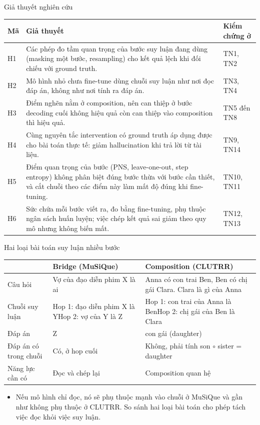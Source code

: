 \documentclass[aspectratio=169,t,10pt]{beamer}
\begin{document}
\begin{frame}[shrink]{Giả thuyết nghiên cứu}
\small
\renewcommand{\arraystretch}{1.35}
\begin{tabularx}{\textwidth}{@{}P{0.8cm}YP{2.4cm}@{}}
\toprule
\textbf{Mã} & \textbf{Giả thuyết} & \textbf{Kiểm chứng ở}\\
\midrule
H1 & Các phép đo tầm quan trọng của bước suy luận đang dùng (masking một bước, resampling) cho kết quả lệch khi đối chiếu với ground truth. & TN1, TN2\\
H2 & Mô hình nhỏ chưa fine-tune dùng chuỗi suy luận như nơi đọc đáp án, không như nơi tính ra đáp án. & TN3, TN4\\
H3 & Điểm nghẽn nằm ở composition, nên can thiệp ở bước decoding cuối không hiệu quả còn can thiệp vào composition thì hiệu quả. & TN5 đến TN8\\
H4 & Cùng nguyên tắc intervention có ground truth áp dụng được cho bài toán thực tế: giảm hallucination khi trả lời từ tài liệu. & TN9, TN14\\
H5 & Điểm quan trọng của bước (PNS, leave-one-out, step entropy) không phân biệt đúng bước thừa với bước cần thiết, và cắt chuỗi theo các điểm này làm mất độ đúng khi fine-tuning. & TN10, TN11\\
H6 & Sức chứa mỗi bước viết ra, đo bằng fine-tuning, phụ thuộc ngân sách huấn luyện; việc chép kết quả sai giảm theo quy mô nhưng không biến mất. & TN12, TN13\\
\bottomrule
\end{tabularx}
\end{frame}

\begin{frame}{Hai loại bài toán suy luận nhiều bước}
\small
\renewcommand{\arraystretch}{1.35}
\begin{tabularx}{\textwidth}{@{}P{2.7cm}YY@{}}
\toprule
 & \textbf{Bridge (MuSiQue)} & \textbf{Composition (CLUTRR)}\\
\midrule
Câu hỏi & Vợ của đạo diễn phim X là ai & Anna có con trai Ben, Ben có chị gái Clara. Clara là gì của Anna\\
Chuỗi suy luận & Hop 1: đạo diễn phim X là Y\newline Hop 2: vợ của Y là Z & Hop 1: con trai của Anna là Ben\newline Hop 2: chị gái của Ben là Clara\\
Đáp án & Z & con gái (daughter)\\
Đáp án có trong chuỗi & Có, ở hop cuối & Không, phải tính son $\circ$ sister = daughter\\
Năng lực cần có & Đọc và chép lại & Composition quan hệ\\
\bottomrule
\end{tabularx}
\vspace{6pt}
\begin{itemize}
  \item Nếu mô hình chỉ đọc, nó sẽ phụ thuộc mạnh vào chuỗi ở MuSiQue và gần như không phụ thuộc ở CLUTRR. So sánh hai loại bài toán cho phép tách việc đọc khỏi việc suy luận.
\end{itemize}
\end{frame}
\end{document}
